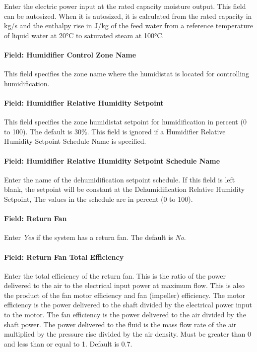 Enter the electric power input at the rated capacity moisture output. This field can be autosized. When it is autosized, it is calculated from the rated capacity in kg/s and the enthalpy rise in J/kg of the feed water from a reference temperature of liquid water at 20°C to saturated steam at 100°C.

\paragraph{Field: Humidifier Control Zone Name}\label{field-humidifier-control-zone-name-5}

This field specifies the zone name where the humidistat is located for controlling humidification.

\paragraph{Field: Humidifier Relative Humidity Setpoint}\label{field-humidifier-relative-humidity-setpoint-1}

This field specifies the zone humidistat setpoint for humidification in percent (0 to 100). The default is 30\%. This field is ignored if a Humidifier Relative Humidity Setpoint Schedule Name is specified.

\paragraph{Field: Humidifier Relative Humidity Setpoint Schedule Name}\label{field-humidifier-relative-humidity-setpoint-schedule-name-1}

Enter the name of the dehumidification setpoint schedule. If this field is left blank, the setpoint will be constant at the Dehumidification Relative Humidity Setpoint, The values in the schedule are in percent (0 to 100).

\paragraph{Field: Return Fan}\label{field-return-fan-3}

Enter \emph{Yes} if the system has a return fan. The default is \emph{No}.

\paragraph{Field: Return Fan Total Efficiency}\label{field-return-fan-total-efficiency-3}

Enter the total efficiency of the return fan. This is the ratio of the power delivered to the air to the electrical input power at maximum flow. This is also the product of the fan motor efficiency and fan (impeller) efficiency. The motor efficiency is the power delivered to the shaft divided by the electrical power input to the motor. The fan efficiency is the power delivered to the air divided by the shaft power. The power delivered to the fluid is the mass flow rate of the air multiplied by the pressure rise divided by the air density. Must be greater than 0 and less than or equal to 1. Default is 0.7.

